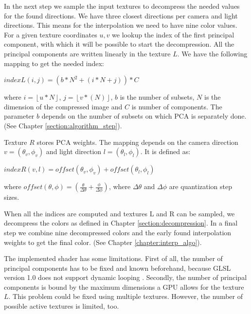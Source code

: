 In the next step we sample the input textures to decompress the needed values for the found directions.
We have three closest directions per camera and light directions. This means for the interpolation we need to have nine color values. 
For a given texture coordinates $u,v$ we lookup the index of the first principal component, with which it will be possible to start the decompression.
All the principal components are written linearly in the texture $L$. 
We have the following mapping to get the needed index:

{\centering$indexL(i,j)= (b*N^2+ (i*N+j))*C$ \\}

where $i=\left \lfloor u*N\right \rfloor$, $j=\left \lfloor v*(N) \right \rfloor$, $b$ is the number of subsets, $N$ is the dimension of the compressed image and $C$ is number of components.
The parameter $b$ depends on the number of subsets on which PCA is separately done. (See Chapter \ref{section:algorithm_step}).

Texture $R$ stores PCA weights.
The mapping depends on the camera direction $v=(\theta_v,\phi_v)$ and light direction $l=(\theta_l,\phi_l)$.
 It is defined as:

{\centering$ indexR(v,l)=offset(\theta_v,\phi_v)+offset(\theta_l,\phi_l)$\\}

where  $offset(\theta,\phi)=(\tfrac{\theta}{\Delta\theta}+\tfrac{\phi}{\Delta\phi})$, where $\Delta\theta$ and $\Delta\phi$ are quantization step sizes.

When all the indices are computed and textures L and R can be sampled, we decompress the colors as defined in Chapter \ref{section:decompression}.
In a final step we combine nine decompressed colors and the early found interpolation weights to get the final color. (See Chapter \ref{chapter:interp_algo}).

The implemented shader has some limitations. First of all, the number of principal components has to be fixed and known beforehand, because GLSL version 1.0 does not support dynamic looping \cite{glsl}.
Secondly, the number of principal components is bound by the maximum dimensions a GPU allows for the texture $L$.
This problem could be fixed using multiple textures. However, the number of possible active textures is limited, too.






 



